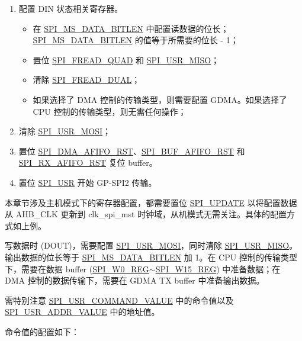 \documentclass[main\_\_CN.tex]{subfiles}
\begin{document}
\begin{enumerate}
    \item 配置 DIN 状态相关寄存器。
        \begin{itemize}
            \item 在 \hyperref[fielddesc:SPIMSDATABITLEN]{SPI\_MS\_DATA\_BITLEN} 中配置读数据的位长； \hyperref[fielddesc:SPIMSDATABITLEN]{SPI\_MS\_DATA\_BITLEN} 的值等于所需要的位长 - 1；
            \item 置位 \hyperref[fielddesc:SPIFREADQUAD]{SPI\_FREAD\_QUAD} 和 \hyperref[fielddesc:SPIUSRMISO]{SPI\_USR\_MISO}；
            \item 清除 \hyperref[fielddesc:SPIFREADDUAL]{SPI\_FREAD\_DUAL}；
            \item 如果选择了 DMA 控制的传输类型，则需要配置 GDMA。如果选择了 CPU 控制的传输类型，则无需任何操作；
        \end{itemize}   
    
    \item 清除 \hyperref[fielddesc:SPIUSRMOSI]{SPI\_USR\_MOSI}；
    \item 置位 \hyperref[fielddesc:SPIDMAAFIFORST]{SPI\_DMA\_AFIFO\_RST}、\hyperref[fielddesc:SPIBUFAFIFORST]{SPI\_BUF\_AFIFO\_RST} 和 \hyperref[fielddesc:SPIRXAFIFORST]{SPI\_RX\_AFIFO\_RST} 复位 buffer。
    
    \item 置位 \hyperref[fielddesc:SPIUSR]{SPI\_USR} 开始 GP-SPI2 传输。
\end{enumerate}

\begin{tiplisting}
本章节涉及主机模式下的寄存器配置，都需要置位 \hyperref[fielddesc:SPIUPDATE]{SPI\_UPDATE} 以将配置数据从 AHB\_CLK 更新到 clk\_spi\_mst 时钟域，从机模式无需关注。具体的配置方式如上例。
\end{tiplisting}

写数据时 (DOUT)，需要配置 \hyperref[fielddesc:SPIUSRMOSI]{SPI\_USR\_MOSI}，同时清除 \hyperref[fielddesc:SPIUSRMISO]{SPI\_USR\_MISO}。输出数据的位长等于 \hyperref[fielddesc:SPIMSDATABITLEN]{SPI\_MS\_DATA\_BITLEN} 加 1。在 CPU 控制的传输类型下，需要在数据 buffer (\hyperref[regdesc:SPIW0REG]{SPI\_W0\_REG}$\sim$\hyperref[regdesc:SPIW15REG]{SPI\_W15\_REG}) 中准备数据；在 DMA 控制的数据传输下，需要在 GDMA TX buffer 中准备输出数据。

需特别注意 \hyperref[fielddesc:SPIUSRCOMMANDVALUE]{SPI\_USR\_COMMAND\_VALUE} 中的命令值以及 \hyperref[fielddesc:SPIUSRADDRVALUE]{SPI\_USR\_ADDR\_VALUE} 中的地址值。 

命令值的配置如下：
\end{document}
